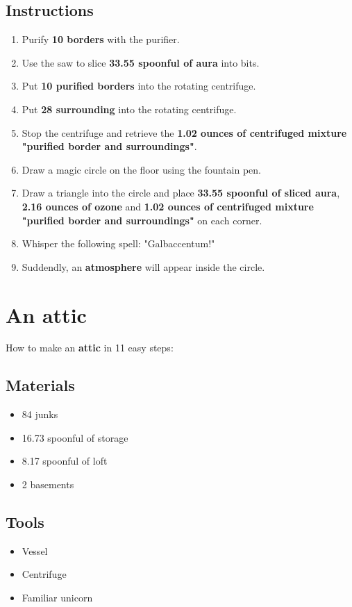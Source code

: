 \documentclass{article}
\begin{document}
\subsection{Instructions}\begin{enumerate}
\item 
Purify \textbf{10 borders} with the purifier.
\item 
Use the saw to slice \textbf{33.55 spoonful of aura} into bits.
\item 
Put \textbf{10 purified borders} into the rotating centrifuge.
\item 
Put \textbf{28 surrounding} into the rotating centrifuge.
\item 
Stop the centrifuge and retrieve the \textbf{1.02 ounces of centrifuged mixture "purified border and surroundings"}.
\item 
Draw a magic circle on the floor using the fountain pen.
\item 
Draw a triangle into the circle and place \textbf{33.55 spoonful of sliced aura}, \textbf{2.16 ounces of ozone} and \textbf{1.02 ounces of centrifuged mixture "purified border and surroundings"} on each corner.
\item 
Whisper the following spell: "Galbaccentum!"
\item 
Suddendly, an \textbf{atmosphere} will appear inside the circle.
\end{enumerate}
\newpage
\section{An attic}How to make an \textbf{attic} in 11 easy steps:

\subsection{Materials}\begin{itemize}
\item 
84 junks
\item 
16.73 spoonful of storage
\item 
8.17 spoonful of loft
\item 
2 basements
\end{itemize}
\subsection{Tools}\begin{itemize}
\item 
Vessel
\item 
Centrifuge
\item 
Familiar unicorn
\end{itemize}
\end{document}
